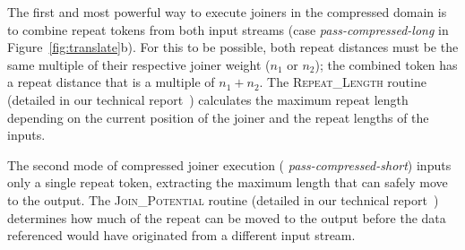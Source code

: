 The first and most powerful way to execute joiners in the compressed
domain is to combine repeat tokens from both input streams (case {\it
  pass-compressed-long} in Figure~\ref{fig:translate}b).  For this to
be possible, both repeat distances must be the same multiple of their
respective joiner weight ($n_1$ or $n_2$); the combined token has a
repeat distance that is a multiple of $n_1 + n_2$.  The
\textsc{Repeat\_Length} routine (detailed in our technical
report~\cite{techreport}) calculates the maximum repeat length
depending on the current position of the joiner and the repeat lengths
of the inputs.

The second mode of compressed joiner execution ({\it
  pass-compressed-short}) inputs only a single repeat token,
extracting the maximum length that can safely move to the output.  The
\textsc{Join\_Potential} routine (detailed in our technical
report~\cite{techreport}) determines how much of the repeat can be
moved to the output before the data referenced would have originated
from a different input stream.


